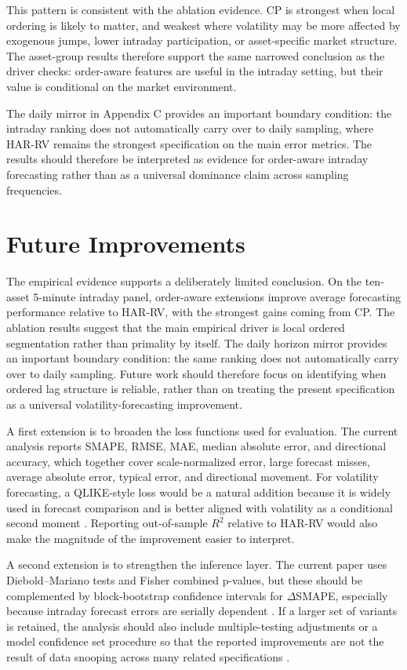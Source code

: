 ﻿\documentclass[11pt,a4paper]{article}
\begin{document}
\noindent
This pattern is consistent with the ablation evidence. CP is strongest when local ordering is likely to matter, and weakest where volatility may be more affected by exogenous jumps, lower intraday participation, or asset-specific market structure. The asset-group results therefore support the same narrowed conclusion as the driver checks: order-aware features are useful in the intraday setting, but their value is conditional on the market environment.

\noindent
The daily mirror in Appendix C provides an important boundary condition: the intraday ranking does not automatically carry over to daily sampling, where HAR-RV remains the strongest specification on the main error metrics. The results should therefore be interpreted as evidence for order-aware intraday forecasting rather than as a universal dominance claim across sampling frequencies.

\section{Future Improvements}

\noindent
The empirical evidence supports a deliberately limited conclusion. On the ten-asset 5-minute intraday panel, order-aware extensions improve average forecasting performance relative to HAR-RV, with the strongest gains coming from CP. The ablation results suggest that the main empirical driver is local ordered segmentation rather than primality by itself. The daily horizon mirror provides an important boundary condition: the same ranking does not automatically carry over to daily sampling. Future work should therefore focus on identifying when ordered lag structure is reliable, rather than on treating the present specification as a universal volatility-forecasting improvement.

\noindent
A first extension is to broaden the loss functions used for evaluation. The current analysis reports SMAPE, RMSE, MAE, median absolute error, and directional accuracy, which together cover scale-normalized error, large forecast misses, average absolute error, typical error, and directional movement. For volatility forecasting, a QLIKE-style loss would be a natural addition because it is widely used in forecast comparison and is better aligned with volatility as a conditional second moment \cite{patton2011}. Reporting out-of-sample $R^2$ relative to HAR-RV would also make the magnitude of the improvement easier to interpret.

\noindent
A second extension is to strengthen the inference layer. The current paper uses Diebold--Mariano tests and Fisher combined p-values, but these should be complemented by block-bootstrap confidence intervals for $\Delta$SMAPE, especially because intraday forecast errors are serially dependent \cite{politis1994}. If a larger set of variants is retained, the analysis should also include multiple-testing adjustments or a model confidence set procedure so that the reported improvements are not the result of data snooping across many related specifications \cite{hansen2011,white2000}.
\end{document}
